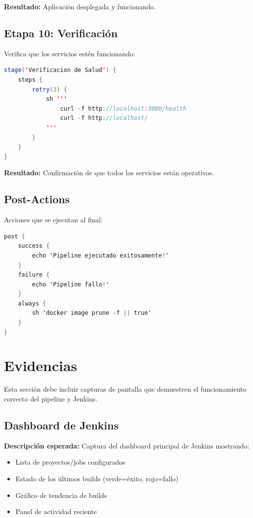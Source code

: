 \documentclass[12pt,a4paper]{article}
\begin{document}
\textbf{Resultado:} Aplicación desplegada y funcionando.

\subsection{Etapa 10: Verificación}

Verifica que los servicios estén funcionando:

\begin{lstlisting}[language=Java]
stage('Verificacion de Salud') {
    steps {
        retry(3) {
            sh '''
                curl -f http://localhost:3000/health
                curl -f http://localhost/
            '''
        }
    }
}
\end{lstlisting}

\textbf{Resultado:} Confirmación de que todos los servicios están operativos.

\subsection{Post-Actions}

Acciones que se ejecutan al final:

\begin{lstlisting}[language=Java]
post {
    success {
        echo 'Pipeline ejecutado exitosamente!'
    }
    failure {
        echo 'Pipeline fallo!'
    }
    always {
        sh 'docker image prune -f || true'
    }
}
\end{lstlisting}

\newpage

\section{Evidencias}

Esta sección debe incluir capturas de pantalla que demuestren el funcionamiento correcto del pipeline y Jenkins.

\subsection{Dashboard de Jenkins}

\textbf{Descripción esperada:} Captura del dashboard principal de Jenkins mostrando:
\begin{itemize}
    \item Lista de proyectos/jobs configurados
    \item Estado de los últimos builds (verde=éxito, rojo=fallo)
    \item Gráfico de tendencia de builds
    \item Panel de actividad reciente
\end{itemize}
\end{document}

